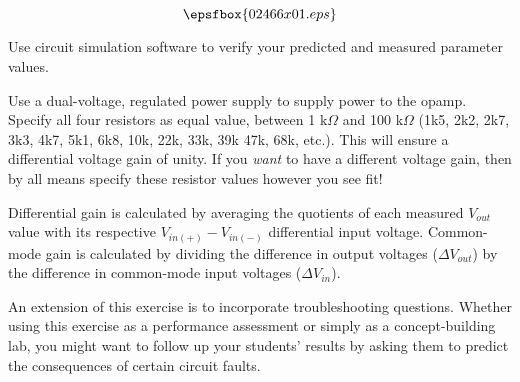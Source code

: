 

$$\epsfbox{02466x01.eps}$$

\vfil \eject






Use circuit simulation software to verify your predicted and measured parameter values.







Use a dual-voltage, regulated power supply to supply power to the opamp.  Specify all four resistors as equal value, between 1 k$\Omega$ and 100 k$\Omega$ (1k5, 2k2, 2k7, 3k3, 4k7, 5k1, 6k8, 10k, 22k, 33k, 39k 47k, 68k, etc.).  This will ensure a differential voltage gain of unity.  If you {\it want} to have a different voltage gain, then by all means specify these resistor values however you see fit!

Differential gain is calculated by averaging the quotients of each measured $V_{out}$ value with its respective $V_{in(+)} - V_{in(-)}$ differential input voltage.  Common-mode gain is calculated by dividing the difference in output voltages ($\Delta V_{out}$) by the difference in common-mode input voltages ($\Delta V_{in}$).

An extension of this exercise is to incorporate troubleshooting questions.  Whether using this exercise as a performance assessment or simply as a concept-building lab, you might want to follow up your students' results by asking them to predict the consequences of certain circuit faults.




